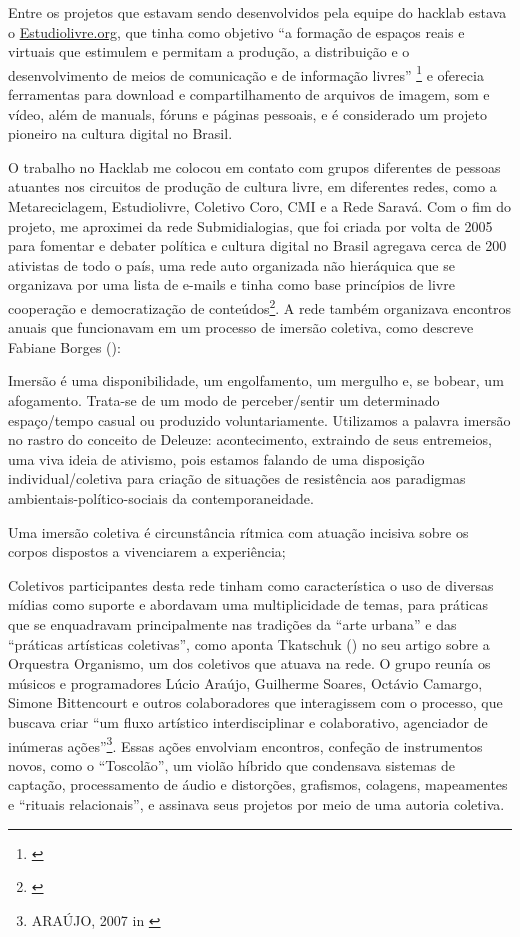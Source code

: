 Entre os projetos que estavam sendo desenvolvidos pela equipe do hacklab estava o \url{Estudiolivre.org}, que tinha como objetivo ``a formação de espaços reais e virtuais que estimulem e permitam a produção, a distribuição e o desenvolvimento de meios de comunicação e de informação livres'' \footnote{\cite[12]{Lima2009}} e oferecia ferramentas para download e compartilhamento de arquivos de imagem, som e vídeo, além de manuals, fóruns e páginas pessoais, e é considerado um projeto pioneiro na cultura digital no Brasil.  


O trabalho no Hacklab me colocou em contato com grupos diferentes de pessoas atuantes nos circuitos de produção de cultura livre, em diferentes redes, como a Metareciclagem, Estudiolivre, Coletivo Coro, CMI e a Rede Saravá. Com o fim do projeto, me aproximei da rede Submidialogias, que foi criada por volta de 2005 para fomentar e debater política e cultura digital no Brasil agregava cerca de 200 ativistas de todo o país, uma rede auto organizada não hieráquica que se organizava por uma lista de e-mails e tinha como base princípios de livre cooperação e democratização de conteúdos\footnote{\cite{Brunet}}. A rede também organizava encontros anuais que funcionavam em um processo de imersão coletiva, como descreve Fabiane Borges (\citeyear{FabianeMoraesBorges2010}):

\begin{citacao}
Imersão é uma disponibilidade, um engolfamento, um mergulho e, se bobear, um afogamento. Trata-se de um modo de perceber/sentir um determinado espaço/tempo casual ou produzido voluntariamente. Utilizamos a palavra imersão no rastro do conceito de Deleuze: acontecimento, extraindo de seus entremeios, uma viva ideia de ativismo, pois estamos falando de uma disposição individual/coletiva para criação de situações de resistência aos paradigmas ambientais-político-sociais da contemporaneidade.

Uma imersão coletiva é circunstância rítmica com atuação incisiva sobre os corpos dispostos a vivenciarem a experiência;
\end{citacao}
 
Coletivos participantes desta rede tinham como característica o uso de diversas mídias como suporte e abordavam uma multiplicidade de temas, para práticas que se enquadravam principalmente nas tradições da ``arte urbana'' e das ``práticas artísticas coletivas'', como aponta Tkatschuk (\citeyear{Tkatschuk2011}) no seu artigo sobre a Orquestra Organismo, um dos coletivos que atuava na rede. O grupo reunía os músicos e programadores Lúcio Araújo, Guilherme Soares, Octávio Camargo, Simone Bittencourt e outros colaboradores que interagissem com o processo, que buscava criar ``um fluxo artístico interdisciplinar e colaborativo, agenciador de inúmeras ações''\footnote{ARAÚJO, 2007 in \cite{Tkatschuk2011}}. Essas ações envolviam encontros, confeção de instrumentos novos, como o ``Toscolão'', um violão híbrido que condensava sistemas de captação, processamento de áudio e distorções, grafismos, colagens, mapeamentes e ``rituais relacionais'', e assinava seus projetos por meio de uma autoria coletiva. 



